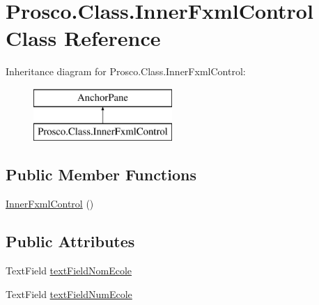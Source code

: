 \hypertarget{class_prosco_1_1_class_1_1_inner_fxml_control}{\section{Prosco.\-Class.\-Inner\-Fxml\-Control Class Reference}
\label{class_prosco_1_1_class_1_1_inner_fxml_control}
}
Inheritance diagram for Prosco.\-Class.\-Inner\-Fxml\-Control\-:\begin{figure}[H]
\begin{center}
\leavevmode
\includegraphics[height=2.000000cm]{class_prosco_1_1_class_1_1_inner_fxml_control}
\end{center}
\end{figure}
\subsection*{Public Member Functions}
\begin{DoxyCompactItemize}
\item 
\hyperlink{class_prosco_1_1_class_1_1_inner_fxml_control_a4e63be96dade1c1b4d5c2d377c8c671d}{Inner\-Fxml\-Control} ()
\end{DoxyCompactItemize}
\subsection*{Public Attributes}
\begin{DoxyCompactItemize}
\item 
Text\-Field \hyperlink{class_prosco_1_1_class_1_1_inner_fxml_control_ac257154f5af4e06ddc41eaa38444a3ab}{text\-Field\-Nom\-Ecole}
\item 
Text\-Field \hyperlink{class_prosco_1_1_class_1_1_inner_fxml_control_ac37709bc3f9f17a4570df610cd7af6d9}{text\-Field\-Num\-Ecole}
\end{DoxyCompactItemize}



